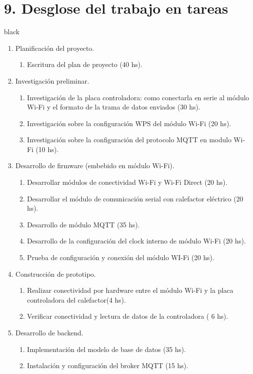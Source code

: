 \documentclass[
11pt, %
codirector, %
]{charter}
\begin{document}
\section{9. Desglose del trabajo en tareas}
\label{sec:wbs}
\begin{consigna}{black}
\begin{enumerate}
\item Planificación del proyecto.
	\begin{enumerate}
	\item Escritura del plan de proyecto (40 hs).
	\end{enumerate}
\item Investigación preliminar.
	\begin{enumerate}
	\item Investigación de la placa controladora: como conectarla en serie al módulo Wi-Fi y el formato de la trama de datos enviados (30 hs).
	\item Investigación sobre la configuración WPS del módulo Wi-Fi (20 hs).
	\item Investigación sobre la configuración del protocolo MQTT en modulo Wi-Fi (10 hs). 
	\end{enumerate}
\item Desarrollo de firmware (embebido en módulo Wi-Fi).
	\begin{enumerate}

	\item Desarrollar módulos de conectividad Wi-Fi y Wi-Fi Direct (20 hs).
	\item Desarrollar el módulo de comunicación serial con calefactor eléctrico (20 hs).
	\item Desarrollo de módulo MQTT (35 hs).
	\item Desarrollo de la configuración del clock interno de módulo Wi-Fi (20 hs).
	\item Prueba de configuración y conexión del módulo WI-Fi (20 hs).
	
	\end{enumerate}
\item Construcción de prototipo.
	\begin{enumerate}
	\item Realizar conectividad por hardware entre el módulo Wi-Fi y la placa controladora del calefactor(4 hs).
	\item Verificar conectividad y lectura de datos de la controladora ( 6 hs).
	
	\end{enumerate}
\item Desarrollo de backend.
	\begin{enumerate}
	\item Implementación del modelo de base de datos (35 hs).
	\item Instalación y configuración del broker MQTT (15 hs).
	

\end{enumerate}
\end{enumerate}
\end{consigna}
\end{document}
